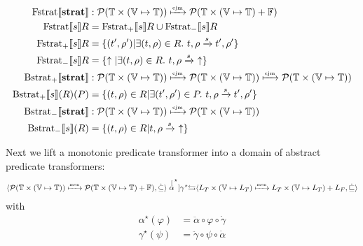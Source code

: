 \documentclass{article}
\newcommand{\fail}{\ensuremath \uparrow}
\newcommand{\Term}{\ensuremath \mathbb{T}}
\newcommand{\Fail}{\ensuremath \mathbb{F}}
\newcommand{\Var}{\ensuremath \mathbb{V}}
\newcommand{\Env}{\ensuremath \Var \mapsto \Term}
\newcommand{\Pow}[1]{\ensuremath \mathcal{P}(#1)}
\newcommand{\Fstrat}[1]{\ensuremath \text{Fstrat}\llbracket #1 \rrbracket}
\newcommand{\Fstratm}[1]{\ensuremath \text{Fstrat}_{-}\llbracket #1 \rrbracket}
\newcommand{\Fstratp}[1]{\ensuremath \text{Fstrat}_{+}\llbracket #1 \rrbracket}
\newcommand{\Bstratp}[1]{\ensuremath \text{Bstrat}_{+} \llbracket #1 \rrbracket}
\newcommand{\Bstratm}[1]{\ensuremath \text{Bstrat}_{-} \llbracket #1 \rrbracket}
\newcommand{\transform}[5]{#1, #2 \xrightarrow{#3} #4, #5}
\newcommand{\transformfail}[3]{#1, #2 \xrightarrow{#3}\ \fail}
\newcommand{\cjm}{\ensuremath \xmapsto{\text{\tiny cjm}}}
\newcommand{\mon}{\ensuremath \xmapsto{\text{\tiny mon}}}
\begin{document}
\begin{align*}
  \Fstrat{\mathbf{strat}} &: \Pow{\Term \times (\Env)} \cjm \Pow{\Term \times (\Env) + \Fail} \\
  \Fstrat{s}R &= \Fstratp{s}R \cup \Fstratm{s}R \\
  \Fstratp{s}R &= \lbrace (t',\rho') | \exists (t,\rho) \in R.\ \transform{t}{\rho}{s}{t'}{\rho'} \rbrace \\
  \Fstratm{s}R &= \lbrace \fail | \exists (t,\rho) \in R.\ \transformfail{t}{\rho}{s} \rbrace \\
  \Bstratp{\mathbf{strat}} &: \Pow{\Term \times (\Env)} \cjm \Pow{\Term \times (\Env)} \cjm \Pow{\Term \times (\Env)} \\
  \Bstratp{s}(R)(P) &= \lbrace (t,\rho) \in R | \exists (t',\rho') \in P.\ \transform{t}{\rho}{s}{t'}{\rho'} \rbrace \\
  \Bstratm{\mathbf{strat}} &: \Pow{\Term \times (\Env)} \cjm \Pow{\Term \times (\Env)} \\
  \Bstratm{s}(R) &= \lbrace (t,\rho) \in R | \transformfail{t}{\rho}{s} \rbrace \\
\end{align*}




Next we lift a monotonic predicate transformer into a domain of abstract predicate transformers:
%
\begin{align*}
  \langle \Pow{\Term \times (\Env)} \mon \Pow{\Term \times (\Env) + \Fail}, \dot{\subseteq} \rangle \stackrel[\alpha^\star]{\gamma^\star}{\leftrightarrows}
  \langle L_T \times (\Var \mapsto L_T) \mon L_T \times (\Var \mapsto L_T) + L_F, \dot{\sqsubseteq} \rangle
\end{align*}
%
with
%
\begin{align*}
  \alpha^\star(\varphi) &= \ddot{\alpha} \circ \varphi \circ \dot{\gamma} \\
  \gamma^\star(\psi) &= \ddot{\gamma} \circ \psi \circ \dot{\alpha}
\end{align*}
\end{document}
